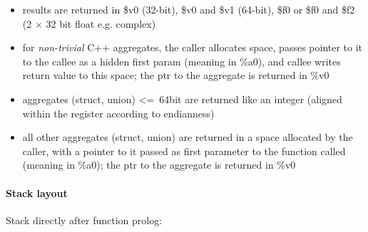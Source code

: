 \begin{itemize}
\item results are returned in \$v0 (32-bit), \$v0 and \$v1 (64-bit), \$f0 or \$f0 and \$f2 (2 $\times$ 32 bit float e.g. complex)
\item for {\it non-trivial} C++ aggregates, the caller allocates space, passes pointer to it to the callee as a hidden first param
(meaning in \%a0), and callee writes return value to this space; the ptr to the aggregate is returned in \%v0
\item aggregates (struct, union) \textless=\ 64bit are returned like an integer (aligned within the register according to endianness)
\item all other aggregates (struct, union) are returned in a space allocated by the caller, with a pointer to it
passed as first parameter to the function called (meaning in \%a0); the ptr to the aggregate is returned in \%v0
\end{itemize}

\paragraph{Stack layout}

Stack directly after function prolog:\\

